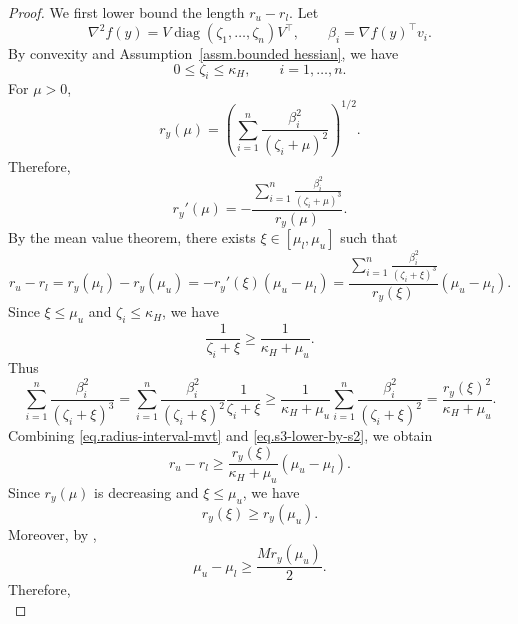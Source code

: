 \documentclass{article}
\numberwithin{equation}{section}
\numberwithin{equation}{section}
\begin{document}
\begin{proof}
    We first lower bound the length \(r_u-r_l\). Let
    \[
        \nabla^2 f(y)=V\operatorname{diag}(\zeta_1,\ldots,\zeta_n)V^\top,
        \qquad
        \beta_i=\nabla f(y)^\top v_i.
    \]
    By convexity and Assumption~\ref{assm.bounded hessian}, we have
    \[
        0\le \zeta_i\le \kappa_H,
        \qquad i=1,\ldots,n.
    \]
    For \(\mu>0\),
    \[
        r_y(\mu)
        =
        \left(
        \sum_{i=1}^n
        \frac{\beta_i^2}{(\zeta_i+\mu)^2}
        \right)^{1/2}.
    \]
    Therefore,
    \begin{equation}
        \label{eq.derivative-ry}
        r_y'(\mu)
        =
        -
        \frac{
            \sum_{i=1}^n
            \frac{\beta_i^2}{(\zeta_i+\mu)^3}
        }{
            r_y(\mu)
        }.
    \end{equation}
    By the mean value theorem, there exists
    \(\xi\in[\mu_l,\mu_u]\) such that
    \begin{equation}
        r_u-r_l
        =
        r_y(\mu_l)-r_y(\mu_u)
        =
        -r_y'(\xi)(\mu_u-\mu_l)
        =
        \frac{
            \sum_{i=1}^n
            \frac{\beta_i^2}{(\zeta_i+\xi)^3}
        }{
            r_y(\xi)
        }
        (\mu_u-\mu_l).
        \label{eq.radius-interval-mvt}
    \end{equation}
    Since \(\xi\le \mu_u\) and \(\zeta_i\le \kappa_H\), we have
    \[
        \frac{1}{\zeta_i+\xi}
        \ge
        \frac{1}{\kappa_H+\mu_u}.
    \]
    Thus
    \begin{equation}
        \sum_{i=1}^n
        \frac{\beta_i^2}{(\zeta_i+\xi)^3}
        =
        \sum_{i=1}^n
        \frac{\beta_i^2}{(\zeta_i+\xi)^2}
        \frac{1}{\zeta_i+\xi}
        \ge
        \frac{1}{\kappa_H+\mu_u}
        \sum_{i=1}^n
        \frac{\beta_i^2}{(\zeta_i+\xi)^2}
        =
        \frac{r_y(\xi)^2}{\kappa_H+\mu_u}.
        \label{eq.s3-lower-by-s2}
    \end{equation}
    Combining \eqref{eq.radius-interval-mvt} and \eqref{eq.s3-lower-by-s2}, we obtain
    \begin{equation}
        \label{eq.radius-interval-lower-1}
        r_u-r_l
        \ge
        \frac{r_y(\xi)}{\kappa_H+\mu_u}
        (\mu_u-\mu_l).
    \end{equation}
    Since \(r_y(\mu)\) is decreasing and \(\xi\le \mu_u\), we have
    \[
        r_y(\xi)\ge r_y(\mu_u).
    \]
    Moreover, by ,
    \[
        \mu_u-\mu_l
        \ge
        \frac{M r_y(\mu_u)}{2}.
    \]
    Therefore,
    \begin{equation}

\end{equation}
\end{proof}
\end{document}
